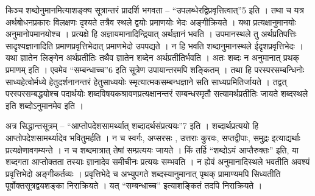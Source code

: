 	किञ्च शब्दोनुमानमित्याशङ्क्य सूत्रान्तरं प्रादर्शि भगवता – “उपलब्धेरद्विप्रवृत्तित्वात्”5 इति । तथा च यत्र अर्थबोधनप्रकारः विलक्षणः दृश्यते तत्रैव स्थले द्वयोः प्रमाणयोः भेदः अङ्गीक्रियते । यथा प्रत्यक्षानुमानयोः अनुमानोपमानयोश्च  । प्रत्यक्षे हि अज्ञायमानादिन्द्रियात् अर्थज्ञानं भवति । उपमानस्थले तु अर्थप्रतिपत्तिः सादृश्यज्ञानादिति प्रमाणप्रवृत्तिभेदात् प्रमाणभेदो उपपद्यते । न हि भवति शब्दानुमानस्थले ईदृशप्रवृत्तिभेदः । यथा ज्ञातेन लिङ्गेन अर्थप्रतीतिः तथैव ज्ञातेन शब्देन अर्थप्रतीतिर्भवति । अतः शब्दः न अनुमानात् प्रथक् प्रमाणम् इति । एवमेव “सम्बन्धाच्च”6 इति सूत्रेण उपायान्तरमपि शङ्कितम् । तथा हि परस्परसम्बन्धिनोः साध्यहेत्वोर्मध्ये हेतुदर्शनानन्तरं हेतुसाध्ययोः स्मृत्यात्मकसम्बन्धज्ञाने सति साध्यप्रमितिर्जायते । तद्वत् परस्परसम्बद्धयोश्च पदार्थयोः शब्दविषयकश्रावणप्रत्यक्षानन्तरं सम्बन्धस्मृतौ सत्यामर्थप्रतीतिः जायते शब्दस्थले इति शब्दोऽनुमानमेव इति । 
	
	अत्र सिद्धान्तसूत्रम् – “आप्तोपदेशसामर्थ्यात् शब्दादर्थसंप्रत्ययः”7 इति । शब्दार्थप्रत्ययो हि आप्तोपदेशसामर्थ्यादेव भवितुमर्हति । न च स्वर्गः, अप्सरसः , उत्तराः कुरवः, सप्तद्वीपाः, समुद्रः इत्याद्यर्थाः प्रत्यक्षेणावगम्यन्ते । न च शब्दमात्रात् तेषां सम्प्रत्ययः जायते । किं तर्हि “शब्दोऽयं आप्तैरुक्तः” इति, या शब्दगता आप्तोक्तता तस्याः ज्ञानादेव समीचीनः प्रत्ययः सम्भवति । न ह्येवं अनुमानादिस्थले भवतीति अवश्यं प्रवृत्तिभेदो अङ्गीकर्तव्यः । प्रवृत्तिभेदे च अभ्युपगते शब्दस्यानुमानात् पृथक् प्रामाण्यमपि सिध्यतीति पूर्वोक्तसूत्रद्वयशङ्का निराक्रियते । यत् “सम्बन्धाच्च” इत्याशङ्कितं तदपि निराक्रियते ।

